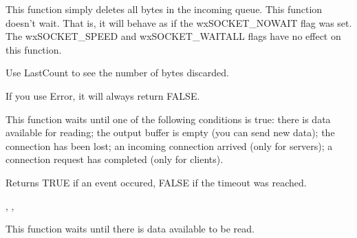 This function simply deletes all bytes in the incoming queue. This function
doesn't wait. That is, it will behave as if the wxSOCKET\_NOWAIT flag was set. The
wxSOCKET\_SPEED and wxSOCKET\_WAITALL flags have no effect on this function.

Use LastCount to see the number of bytes discarded.

If you use Error, it will always return FALSE.

\label{wxsocketbasewait}


This function waits until one of the following conditions is true: there
is data available for reading; the output buffer is empty (you can send
new data); the connection has been lost; an incoming connection arrived
(only for servers); a connection request has completed (only for clients).





Returns TRUE if an event occured, FALSE if the timeout was reached.


, 
, 

%
%
\label{wxsocketbasewaitforread}


This function waits until there is data available to be read.




